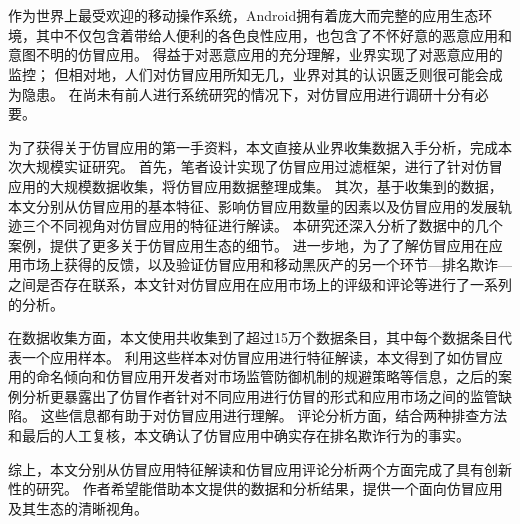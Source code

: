
\chapter*{}
\vspace{-5mm}

\setlength{\baselineskip}{25pt} %

作为世界上最受欢迎的移动操作系统，Android拥有着庞大而完整的应用生态环境，其中不仅包含着带给人便利的各色良性应用，也包含了不怀好意的恶意应用和意图不明的仿冒应用。
得益于对恶意应用的充分理解，业界实现了对恶意应用的监控；
但相对地，人们对仿冒应用所知无几，业界对其的认识匮乏则很可能会成为隐患。
在尚未有前人进行系统研究的情况下，对仿冒应用进行调研十分有必要。

为了获得关于仿冒应用的第一手资料，本文直接从业界收集数据入手分析，完成本次大规模实证研究。
首先，笔者设计实现了仿冒应用过滤框架\mytool ，进行了针对仿冒应用的大规模数据收集，将仿冒应用数据整理成集。
其次，基于收集到的数据，本文分别从仿冒应用的基本特征、影响仿冒应用数量的因素以及仿冒应用的发展轨迹三个不同视角对仿冒应用的特征进行解读。
本研究还深入分析了数据中的几个案例，提供了更多关于仿冒应用生态的细节。
进一步地，为了了解仿冒应用在应用市场上获得的反馈，以及验证仿冒应用和移动黑灰产的另一个环节---排名欺诈---之间是否存在联系，本文针对仿冒应用在应用市场上的评级和评论等进行了一系列的分析。

在数据收集方面，本文使用\mytool 共收集到了超过15万个数据条目，其中每个数据条目代表一个应用样本。
利用这些样本对仿冒应用进行特征解读，本文得到了如仿冒应用的命名倾向和仿冒应用开发者对市场监管防御机制的规避策略等信息，之后的案例分析更暴露出了仿冒作者针对不同应用进行仿冒的形式和应用市场之间的监管缺陷。
这些信息都有助于对仿冒应用进行理解。
评论分析方面，结合两种排查方法和最后的人工复核，本文确认了仿冒应用中确实存在排名欺诈行为的事实。

综上，本文分别从仿冒应用特征解读和仿冒应用评论分析两个方面完成了具有创新性的研究。
作者希望能借助本文提供的数据和分析结果，提供一个面向仿冒应用及其生态的清晰视角。

 
